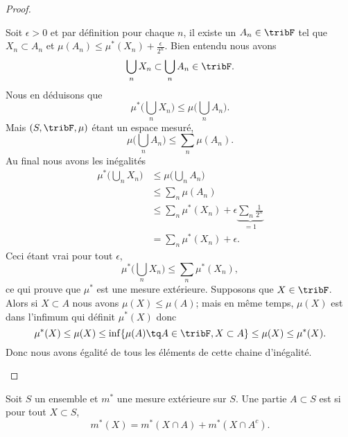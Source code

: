 \begin{proof}
\begin{subproof}
		Soit \( \epsilon>0\) et par définition pour chaque \( n\), il existe un \( A_n\in \tribF\) tel que \( X_n\subset A_n\) et \( \mu(A_n)\leq \mu^*(X_n)+\frac{ \epsilon }{ 2^n }\). Bien entendu nous avons
		\begin{equation}
			\bigcup_nX_n\subset \bigcup_nA_n\in\tribF.
		\end{equation}
		Nous en déduisons que
		\begin{equation}
			\mu^*\big( \bigcup_nX_n \big)\leq\mu\big( \bigcup_nA_n \big).
		\end{equation}
		Mais \( (S,\tribF,\mu)\) étant un espace mesuré,
		\begin{equation}
			\mu\big( \bigcup_nA_n \big)\leq \sum_n\mu(A_n).
		\end{equation}
		Au final nous avons les inégalités
		\begin{subequations}
			\begin{align}
				\mu^*\big( \bigcup_nX_n \big) & \leq  \mu\big( \bigcup_nA_n \big)                                       \\
				                              & \leq  \sum_n\mu(A_n)                                                    \\
				                              & \leq  \sum_n\mu^*(X_n)+\epsilon\underbrace{ \sum_n\frac{1}{ 2^n }}_{=1} \\
				                              & =   \sum_n\mu^*(X_n)+\epsilon.
			\end{align}
		\end{subequations}
		Ceci étant vrai pour tout \( \epsilon\),
		\begin{equation}
			\mu^*\big( \bigcup_nX_n \big)\leq\sum_n\mu^*(X_n),
		\end{equation}
		ce qui prouve que \( \mu^*\) est une mesure extérieure.
		\spitem[Restriction]
		Supposons que \( X\in\tribF\). Alors si \( X\subset A\) nous avons \( \mu(X)\leq \mu(A)\); mais en même temps, \( \mu(X)\) est dans l'infimum qui définit \( \mu^*(X)\) donc
		\begin{equation}
			\mu^*(X)\leq\mu(X)\leq \inf \{ \mu(A)\tq A\in\tribF,X\subset A \}\leq \mu(X)\leq\mu^*(X).
		\end{equation}
		Donc nous avons égalité de tous les éléments de cette chaine d'inégalité.
	\end{subproof}
\end{proof}

\begin{definition}  \label{DefTRBoorvnUY}
	Soit \( S\) un ensemble et \( m^*\) une mesure extérieure sur \( S\). Une partie \( A\subset S\) est  si pour tout \( X\subset S\),
	\begin{equation}
		m^*(X)=m^*(X\cap A)+m^*(X\cap A^c).
	\end{equation}
\end{definition}

